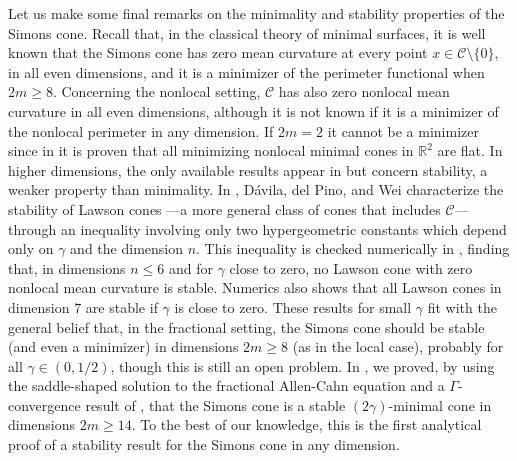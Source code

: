 \documentclass[12pt,reqno]{amsart}
\theoremstyle{definition}
\theoremstyle{remark}
\newcommand{\con}[1]{\mathbb{#1}}
\newcommand{\R}{\con{R}} %
\newcommand{\ccal}{\mathscr{C}}
\newcommand{\s}{\gamma}
\numberwithin{equation}{section}
\begin{document}
	Let us make some final remarks on the minimality and stability properties of the Simons cone. Recall that, in the classical theory of minimal surfaces, it is well known that the Simons cone has zero mean curvature at every point $x\in \ccal \setminus \{0\}$, in all even dimensions, and it is a minimizer of the perimeter functional when $2m\geq 8$. Concerning the nonlocal setting, $\ccal$ has also zero nonlocal mean curvature in all even dimensions, although it is not known if it is a minimizer of the nonlocal perimeter in any dimension. If $2m=2$ it cannot be a minimizer since in \cite{SavinValdinoci-Cones} it is proven that all minimizing nonlocal minimal cones in $\R^2$ are flat. In higher dimensions, the only available results appear in \cite{DaviladelPinoWei, Felipe-Sanz-Perela:SaddleFractional} but concern stability, a weaker property than minimality. In \cite{DaviladelPinoWei},  Dávila, del Pino, and Wei characterize the stability of Lawson cones ---a more general class of cones that includes $\ccal$--- through an inequality involving only two hypergeometric constants which depend only on $\s$ and the dimension $n$. This inequality is checked numerically in \cite{DaviladelPinoWei}, finding that, in dimensions $n \leq 6$ and for $\s$ close to zero, no Lawson cone with zero nonlocal mean curvature is stable. Numerics also shows that all Lawson cones in dimension $7$ are stable if $\s$ is close to zero. These results for small $\s$ fit with the general belief that, in the fractional setting, the Simons cone should be stable (and even a minimizer) in dimensions $2m \geq 8$ (as in the local case), probably for all $\s\in(0,1/2)$, though this is still an open problem. In \cite{Felipe-Sanz-Perela:SaddleFractional}, we proved, by using the saddle-shaped solution to the fractional Allen-Cahn equation and a $\Gamma$-convergence result of \cite{CabreCintiSerra-Stable}, that the Simons cone is a stable $(2\s)$-minimal cone in dimensions $2m\geq 14$. To the best of our knowledge, this is the first analytical proof of a stability result for the Simons cone in any dimension.
	
	
	
\end{document}
